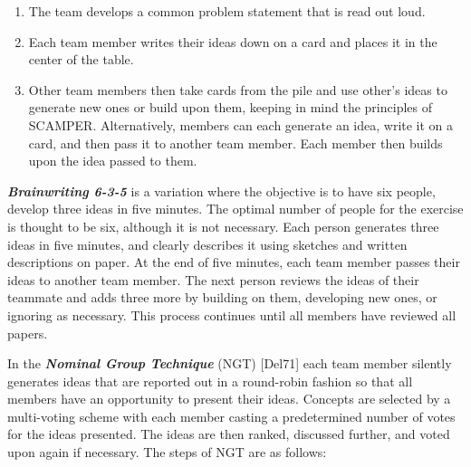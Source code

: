 \begin{enumerate}
\def\labelenumi{\arabic{enumi}.}
\item
  The team develops a common problem statement that is read out loud.
\item
  Each team member writes their ideas down on a card and places it in
  the center of the table.
\item
  Other team members then take cards from the pile and use other's ideas
  to generate new ones or build upon them, keeping in mind the
  principles of SCAMPER. Alternatively, members can each generate an
  idea, write it on a card, and then pass it to another team member.
  Each member then builds upon the idea passed to them.
\end{enumerate}

\emph{\textbf{Brainwriting 6-3-5}} is a variation where the objective is
to have six people, develop three ideas in five minutes. The optimal
number of people for the exercise is thought to be six, although it is
not necessary. Each person generates three ideas in five minutes, and
clearly describes it using sketches and written descriptions on paper.
At the end of five minutes, each team member passes their ideas to
another team member. The next person reviews the ideas of their teammate
and adds three more by building on them, developing new ones, or
ignoring as necessary. This process continues until all members have
reviewed all papers.

In the \emph{\textbf{Nominal Group Technique}} (NGT) {[}Del71{]} each
team member silently generates ideas that are reported out in a
round-robin fashion so that all members have an opportunity to present
their ideas. Concepts are selected by a multi-voting scheme with each
member casting a predetermined number of votes for the ideas presented.
The ideas are then ranked, discussed further, and voted upon again if
necessary. The steps of NGT are as follows:

